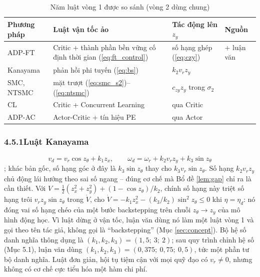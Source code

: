 \documentclass[12pt,a4paper]{article}
\makeatletter
\newcommand{\seclabel}[2]{\phantomsection\protected@edef\@currentlabel{#2}\label{#1}}
\makeatother
\begin{document}
\begin{table}[H]
\centering
\caption{Năm luật vòng 1 được so sánh (vòng 2 dùng chung)}
\label{tab:step1_laws}
\small
\begin{tabular}{l >{\raggedright\arraybackslash}p{4.4cm} >{\raggedright\arraybackslash}p{3.6cm} >{\raggedright\arraybackslash}p{2.6cm}}
\toprule
\textbf{Phương pháp} & \textbf{Luật vận tốc ảo} & \textbf{Tác động lên $z_y$} & \textbf{Nguồn} \\
\midrule
ADP-FT & Critic + thành phần bền vững cố định thời gian (\ref{eq:ft_control}) & số hạng ghép (\ref{eq:czy}) & \cite{Wang2025} + luận văn \\
Kanayama & phản hồi phi tuyến (\ref{eq:bs}) & $k_2 v_r z_y$ & \cite{Kanayama1990} \\
SMC, NTSMC & mặt trượt (\ref{eq:smc_s2})--(\ref{eq:ntsmc}) & $c_{zy} z_y$ trong $\sigma_2$ & \cite{Slotine1991, Feng2002, YuMan2002} \\
CL & Critic + Concurrent Learning & qua Critic & \cite{Chowdhary2010} \\
ADP-AC & Actor-Critic + tín hiệu PE & qua Actor & \cite{Vamvoudakis2010} \\
\bottomrule
\end{tabular}
\end{table}

\subsubsection*{4.5.1\quad Luật Kanayama}
\seclabel{sec:bs}{4.5.1}

\begin{equation}\label{eq:bs}
    v_d = v_r\cos z_\theta + k_1 z_x, \qquad \omega_d = \omega_r + k_2 v_r z_y + k_3 \sin z_\theta
\end{equation}
\cite{Kanayama1990}; khác bản gốc, số hạng góc ở đây là $k_3\sin z_\theta$ thay cho $k_3 v_r\sin z_\theta$. Số hạng $k_2 v_r z_y$ chủ động lái hướng theo sai số ngang -- đúng cơ chế mà Bổ đề \ref{lem:gap} chỉ ra là cần thiết. Với $V = \frac12(z_x^2 + z_y^2) + (1 - \cos z_\theta)/k_2$, chính số hạng này triệt số hạng trôi $v_r z_y \sin z_\theta$ trong $\dot V$, cho $\dot V = -k_1 z_x^2 - (k_3/k_2)\sin^2 z_\theta \leq 0$ khi $\eta = \eta_d$: nó đóng vai số hạng chéo của một bước backstepping trên chuỗi $z_\theta \to z_y$ của mô hình động học. Vì luật dừng ở vận tốc, luận văn dùng nó làm một luật vòng 1 và gọi theo tên tác giả, không gọi là ``backstepping'' (Mục \ref{sec:concept}). Bộ hệ số danh nghĩa thông dụng là $(k_1, k_2, k_3) = (1{,}5;\ 3;\ 2)$; sau quy trình chỉnh hệ số (Mục 5.1), luận văn dùng $(k_1, k_2, k_3) = (0{,}375;\ 0{,}75;\ 0{,}5)$, tức một phần tư bộ danh nghĩa. Luật đơn giản, hội tụ tiệm cận với mọi quỹ đạo có $v_r \neq 0$, nhưng không có cơ chế cực tiểu hóa một hàm chi phí.
\end{document}
